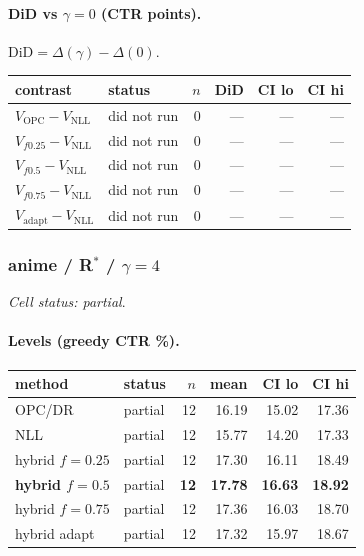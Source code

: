 \documentclass[10pt,a4paper]{article}
\begin{document}
\paragraph{DiD vs $\gamma=0$ (CTR points).} $\mathrm{DiD}=\Delta(\gamma)-\Delta(0)$.
{\centering\small\begin{tabular}{llrrrr}
\toprule contrast & status & $n$ & DiD & CI lo & CI hi \\
\midrule
$V_{\mathrm{OPC}}-V_{\mathrm{NLL}}$ & did not run & 0 & --- & --- & --- \\
$V_{f0.25}-V_{\mathrm{NLL}}$ & did not run & 0 & --- & --- & --- \\
$V_{f0.5}-V_{\mathrm{NLL}}$ & did not run & 0 & --- & --- & --- \\
$V_{f0.75}-V_{\mathrm{NLL}}$ & did not run & 0 & --- & --- & --- \\
$V_{\mathrm{adapt}}-V_{\mathrm{NLL}}$ & did not run & 0 & --- & --- & --- \\
\bottomrule\end{tabular}\par}
\bigskip
\subsubsection{anime / R$^*$ / $\gamma=4$}
\emph{Cell status: partial}.
\paragraph{Levels (greedy CTR \%).}
{\centering\small\begin{tabular}{llrrrr}
\toprule method & status & $n$ & mean & CI lo & CI hi \\
\midrule
OPC/DR & partial & 12 & 16.19 & 15.02 & 17.36 \\
NLL & partial & 12 & 15.77 & 14.20 & 17.33 \\
hybrid $f{=}0.25$ & partial & 12 & 17.30 & 16.11 & 18.49 \\
\textbf{hybrid $f{=}0.5$} & partial & \textbf{12} & \textbf{17.78} & \textbf{16.63} & \textbf{18.92} \\
hybrid $f{=}0.75$ & partial & 12 & 17.36 & 16.03 & 18.70 \\
hybrid adapt & partial & 12 & 17.32 & 15.97 & 18.67 \\
\bottomrule\end{tabular}\par}
\end{document}
